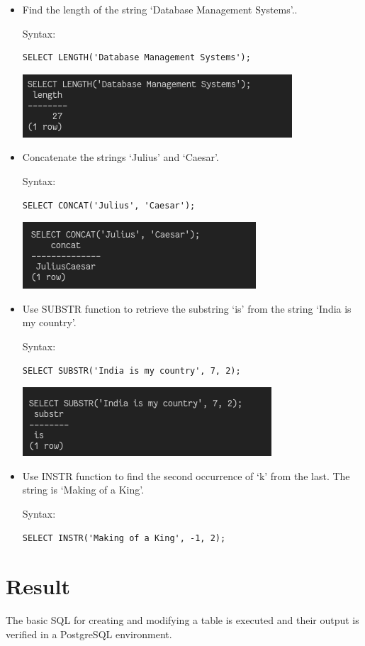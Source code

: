\documentclass[13pt,oneside]{book}
\begin{document}
\begin{itemize}
\item
Find the length of the string ‘Database Management Systems’..
 
Syntax:
\begin{verbatim}
SELECT LENGTH('Database Management Systems');

\end{verbatim}
\includegraphics[]{img/p6/ss19.png}


\item
Concatenate the strings ‘Julius’ and ‘Caesar’.
 
Syntax:
\begin{verbatim}
SELECT CONCAT('Julius', 'Caesar');

\end{verbatim}
\includegraphics[]{img/p6/ss20.png}


\item
Use SUBSTR function to retrieve the substring ‘is’ from the string ‘India is
 my country’.
 
Syntax:
\begin{verbatim}
SELECT SUBSTR('India is my country', 7, 2);

\end{verbatim}
\includegraphics[]{img/p6/ss21.png}


\item
Use INSTR function to find the second occurrence of ‘k’ from the last. The
 string is ‘Making of a King’.

Syntax:
\begin{verbatim}
SELECT INSTR('Making of a King', -1, 2);

\end{verbatim}
\end{itemize}
\section*{Result}
	The basic SQL for creating and modifying a table is executed and their output
	is verified in a PostgreSQL environment.
\end{document}
